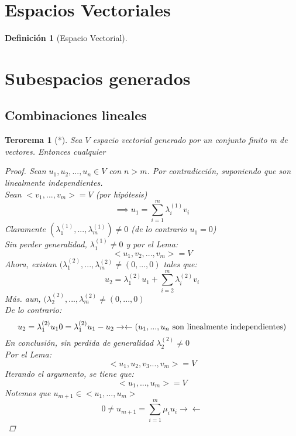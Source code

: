 \documentclass[11pt]{book}
\newtheorem{thm}{Terorema}[section]
\theoremstyle{definition}
\newtheorem{defn}{Definición}[section]
\begin{document}
\section{Espacios Vectoriales}
\begin{defn}[Espacio Vectorial]
	
\end{defn}
\section{Subespacios generados}
\subsection{Combinaciones lineales}
\begin{thm}[*]
	Sea $V$ espacio vectorial generado por un conjunto finito m de vectores. Entonces cualquier

	\begin{proof}
		Sean $u_1,u_2,...,u_n\in V$ con $n>m$. Por contradicción, suponiendo que son linealmente independientes.\\
		Sean $<v_1,...,v_m>=V$ (por hipótesis)
		\[
		\implies u_1=\sum^m_{i=1}\lambda_i^{(1)} v_i
		\]
		Claramente $(\lambda_1^{(1)},...,\lambda_m^{(1)})\neq 0$ (de lo contrario $u_1=0$)\\
		Sin perder generalidad, $\lambda_1^{(1)}\neq 0$ y por el Lema:
		\[
		<u_1,v_2,...,v_m>=V
		\]
		Ahora, existan $(\lambda_1^{(2)},...,\lambda_m^{(2)}\neq(0,...,0)$ tales que:
		\[
		u_2=\lambda_1^{(2)} u_1+\sum^m_{i=2}\lambda_i^{(2)}v_i
		\]
		Más. aun, $(\lambda_2^{(2)},...,\lambda_m^{(2)}\neq(0,...,0)$\\
		De lo contrario:
		\[
		u_2=\lambda_1^{(2)}u_1\\
		0=\lambda_1^{(2)}u_1-u_2\\
		\rightarrow\leftarrow (u_1,...,u_n\textrm{ son linealmente independientes})
		\]
		En conclusión, sin perdida de generalidad  $\lambda_2^{(2)}\neq 0$\\
		Por el Lema:
		\[
		<u_1,u_2,v_3...,v_m>=V
		\]
		Iterando el argumento, se tiene que:
		\[
		<u_1,...,u_m>=V
		\]
		Notemos que $u_{m+1}\in<u_1,...,u_m>$
		\[
		0\neq u_{m+1}=\sum^m_{i=1}\mu_i u_i
		\rightarrow\leftarrow
		\]		
	\end{proof}
\end{thm}
\end{document}
